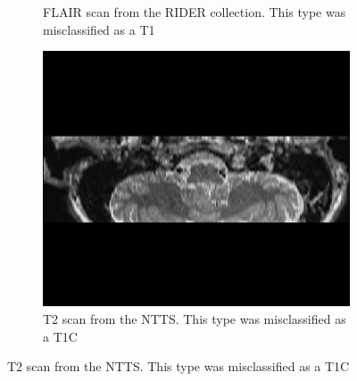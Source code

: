 \begin{figure}
\begin{subfigure}[t]{0.25\textwidth}
        \caption{\gls{FLAIR} \gls{scan} from the \gls{RIDER} collection. This \gls{type} was misclassified as a \gls{T1}}\label{fig:RIDER_FLAIR}
    \end{subfigure}
    \hfill
    \begin{subfigure}[t]{0.25\textwidth}
        \centering
        \includegraphics[width=\textwidth]{Figures/T2_hippocampus}
        \caption{\gls{T2} \gls{scan} from the \gls{NTTS}. This \gls{type} was misclassified as a \gls{T1C}}\label{fig:T2_hippo}
    \end{subfigure}


\end{figure}

